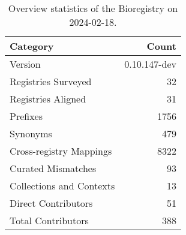 \begin{table}
\caption{Overview statistics of the Bioregistry on 2024-02-18.}
\label{tab:bioregistry-summary}
\begin{tabular}{lr}
\toprule
Category & Count \\
\midrule
Version & 0.10.147-dev \\
Registries Surveyed & 32 \\
Registries Aligned & 31 \\
Prefixes & 1756 \\
Synonyms & 479 \\
Cross-registry Mappings & 8322 \\
Curated Mismatches & 93 \\
Collections and Contexts & 13 \\
Direct Contributors & 51 \\
Total Contributors & 388 \\
\bottomrule
\end{tabular}
\end{table}
